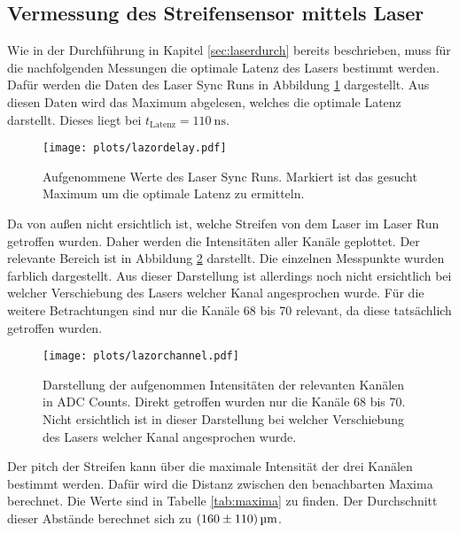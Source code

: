 \subsection{Vermessung des Streifensensor mittels Laser}

Wie in der Durchführung in Kapitel \ref{sec:laserdurch} bereits beschrieben, muss für die nachfolgenden Messungen die optimale Latenz des Lasers bestimmt werden.
Dafür werden die Daten des Laser Sync Runs in Abbildung \ref{fig:lazordelay} dargestellt.
Aus diesen Daten wird das Maximum abgelesen, welches die optimale Latenz darstellt.
Dieses liegt bei $t_\text{Latenz} = \SI{110}{\nano\second}$.

\begin{figure}[H]
  \centering
  \texttt{[image: plots/lazordelay.pdf]}
  \caption{Aufgenommene Werte des Laser Sync Runs. Markiert ist das gesucht Maximum um die optimale Latenz zu ermitteln.}
  \label{fig:lazordelay}
\end{figure}

Da von außen nicht ersichtlich ist, welche Streifen von dem Laser im Laser Run getroffen wurden.
Daher werden die Intensitäten aller Kanäle geplottet.
Der relevante Bereich ist in Abbildung \ref{fig:lazorchannel} darstellt.
Die einzelnen Messpunkte wurden farblich dargestellt.
Aus dieser Darstellung ist allerdings noch nicht ersichtlich bei welcher Verschiebung des Lasers welcher Kanal angesprochen wurde.
Für die weitere Betrachtungen sind nur die Kanäle 68 bis 70 relevant, da diese tatsächlich getroffen wurden.

\begin{figure}[H]
  \centering
  \texttt{[image: plots/lazorchannel.pdf]}
  \caption{Darstellung der aufgenommen Intensitäten der relevanten Kanälen in ADC Counts. Direkt getroffen wurden nur die Kanäle 68 bis 70. Nicht ersichtlich ist in dieser Darstellung bei welcher Verschiebung des Lasers welcher Kanal angesprochen wurde.}
  \label{fig:lazorchannel}
\end{figure}

Der pitch der Streifen kann über die maximale Intensität der drei Kanälen bestimmt werden.
Dafür wird die Distanz zwischen den benachbarten Maxima berechnet.
Die Werte sind in Tabelle \ref{tab:maxima} zu finden.
Der Durchschnitt dieser Abstände berechnet sich zu $\SI{160 \pm 110}{\micro\metre}$.

